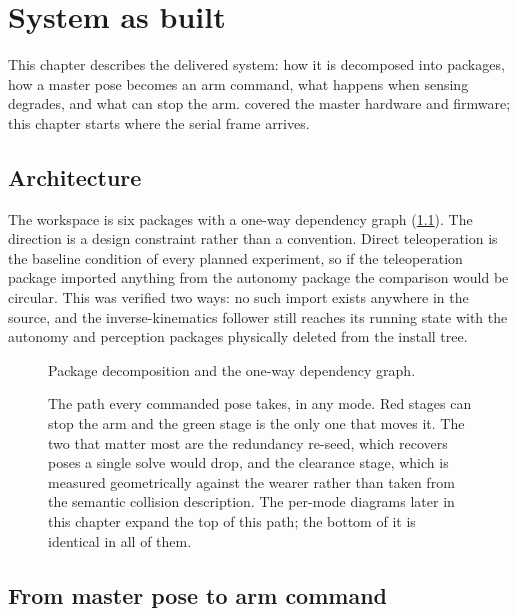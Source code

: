 \chapter{System as built}
\label{ch:method}

This chapter describes the delivered system: how it is decomposed into
packages, how a master pose becomes an arm command, what happens when sensing
degrades, and what can stop the arm.  covered the master
hardware and firmware; this chapter starts where the serial frame arrives.

\section{Architecture}

The workspace is six packages with a one-way dependency
graph (\cref{fig:arch}). The direction is a design constraint rather than a
convention. Direct teleoperation is the baseline condition of every planned
experiment, so if the teleoperation package imported anything from the
autonomy package the comparison would be circular. This was verified two ways:
no such import exists anywhere in the source, and the inverse-kinematics
follower still reaches its running state with the autonomy and perception
packages physically deleted from the install tree.

\begin{figure}[htbp]
  \centering
  
  \caption[Package architecture]{Package decomposition and the one-way
  dependency graph.}
  \label{fig:arch}
\end{figure}

\begin{figure}[htbp]
  \centering
  
  \caption[The command path]{The path every commanded pose takes, in any mode.
  Red stages can stop the arm and the green stage is the only one that moves
  it. The two that matter most are the redundancy re-seed, which recovers
  poses a single solve would drop, and the clearance stage, which is measured
  geometrically against the wearer rather than taken from the semantic
  collision description. The per-mode diagrams later in this chapter expand
  the top of this path; the bottom of it is identical in all of them.}
  \label{fig:datapath}
\end{figure}

\section{From master pose to arm command}

